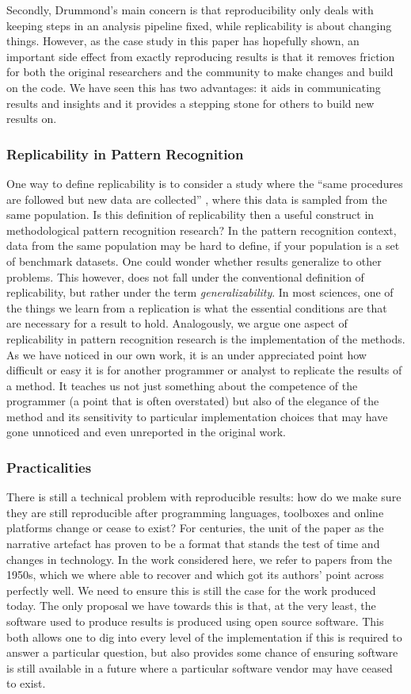 \documentclass[runningheads,a4paper]{llncs}\usepackage[]{graphicx}\usepackage[]{color}
\begin{document}
Secondly, Drummond's main concern is that reproducibility only deals with keeping steps in an analysis pipeline fixed, while replicability is about changing things. However, as the case study in this paper has hopefully shown, an important side effect from exactly reproducing results is that it removes friction for both the original researchers and the community to make changes and build on the code. We have seen this has two advantages: it aids in communicating results and insights and it provides a stepping stone for others to build new results on.

\subsubsection{Replicability in Pattern Recognition}
One way to define replicability is to consider a study where the ``same procedures are followed but new data are collected'' \cite{Goodman2016a}, where this data is sampled from the same population. Is this definition of replicability then a useful construct in methodological pattern recognition research? In the pattern recognition context, data from the same population may be hard to define, if your population is a set of benchmark datasets. One could wonder whether results generalize to other problems. This however, does not fall under the conventional definition of replicability, but rather under the term \emph{generalizability}. 
In most sciences, one of the things we learn from a replication is what the essential conditions are that are necessary for a result to hold. Analogously, we argue one aspect of replicability in pattern recognition research is the implementation of the methods. As we have noticed in our own work, it is an under appreciated point how difficult or easy it is for another programmer or analyst to replicate the results of a method. It teaches us not just something about the competence of the programmer (a point that is often overstated) but also of the elegance of the method and its sensitivity to particular implementation choices that may have gone unnoticed and even unreported in the original work.

\subsubsection{Practicalities}
There is still a technical problem with reproducible results: how do we make sure they are still reproducible after programming languages, toolboxes and online platforms change or cease to exist? For centuries, the unit of the paper as the narrative artefact has proven to be a format that stands the test of time and changes in technology. In the work considered here, we refer to papers from the 1950s, which we where able to recover and which got its authors' point across perfectly well. We need to ensure this is still the case for the work produced today. The only proposal we have towards this is that, at the very least, the software used to produce results is produced using open source software. This both allows one to dig into every level of the implementation if this is required to answer a particular question, but also provides some chance of ensuring software is still available in a future where a particular software vendor may have ceased to exist.
\end{document}
